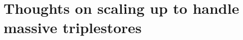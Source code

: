 \documentclass[../main.tex]{subfiles}
\begin{document}
\chapter{Thoughts on scaling up to handle massive triplestores}
\end{document}
